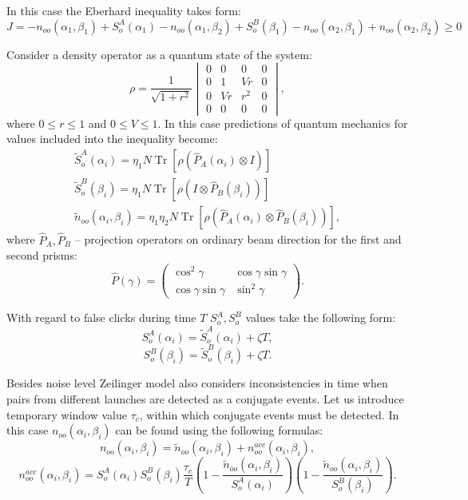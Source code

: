 \documentclass[%
master,         %
subf,           %
href,           %
colorlinks=true %
]{disser}
\DeclareMathOperator{\Tr}{Tr}
\numberwithin{equation}{section}
\numberwithin{figure}{section}
\begin{document}
In this case the Eberhard inequality takes form:
\begin{equation}
J = -n_{oo}(\alpha_1, \beta_1) + S_o^A(\alpha_1) - n_{oo}(\alpha_1, \beta_2) + S_o^B(\beta_1) - n_{oo}(\alpha_2, \beta_1) + n_{oo}(\alpha_2, \beta_2) \geq 0
\label{eq:Zeilinger_J}
\end{equation}

Consider a density operator as a quantum state of the system:
\[
\rho = \frac{1}{\sqrt{1+r^2}}
\begin{vmatrix}
0 & 0 & 0 & 0\\
0 & 1 & Vr & 0\\
0 & Vr & r^2 & 0\\
0 & 0 & 0 & 0
\end{vmatrix},
\]
where $0 \leq r \leq 1$ and $0 \leq V \leq 1$.
In this case predictions of quantum mechanics for values included into the inequality become:
\begin{eqnarray*}
\tilde{S}_o^A(\alpha_i) = \eta_1 N \Tr[\rho(\hat{P}_A(\alpha_i) \otimes I)]\\
\tilde{S}_o^B(\beta_i) = \eta_1 N \Tr[\rho(I \otimes \hat{P}_B(\beta_i))]\\
\tilde{n}_{oo}(\alpha_i, \beta_i) = \eta_1\eta_2 N \Tr[\rho(\hat{P}_A(\alpha_i) \otimes \hat{P}_B(\beta_i))],
\end{eqnarray*}
where $\hat{P}_A, \hat{P}_B$ -- projection operators on ordinary beam direction for the first and second prisms:
\[
\hat{P}(\gamma) = 
\begin{pmatrix}
\cos^2\gamma & \cos\gamma\sin\gamma\\
\cos\gamma\sin\gamma & \sin^2\gamma
\end{pmatrix}.
\]

With regard to false clicks during time $T$ $S_o^A, S_o^B$ values take the following form:
\[
S_o^A(\alpha_i) = \tilde{S}_o^A(\alpha_i) + \zeta T,
\]
\[
S_o^B(\beta_i) = \tilde{S}_o^B(\beta_i) + \zeta T.
\]

Besides noise level Zeilinger model also considers inconsistencies in time when pairs from different 
launches are detected as a conjugate events. Let us introduce temporary window value $\tau_c$, within 
which conjugate events must be detected. In this case $n_{oo}(\alpha_i, \beta_i)$ can be found using 
the following formulas:
\[
n_{oo}(\alpha_i, \beta_i) = \tilde{n}_{oo}(\alpha_i, \beta_i) + n_{oo}^{acc}(\alpha_i, \beta_i),
\]
\[
n_{oo}^{acc}(\alpha_i, \beta_i) = S_o^A(\alpha_i)S_o^B(\beta_i)\frac{\tau_c}{T}\left(1 - \frac{\tilde{n}_{oo}(\alpha_i, \beta_i)}{S_o^A(\alpha_i)}\right) \left( 1 - \frac{\tilde{n}_{oo}(\alpha_i, \beta_i)}{S_o^B(\beta_i)}\right).
\]
\end{document}
